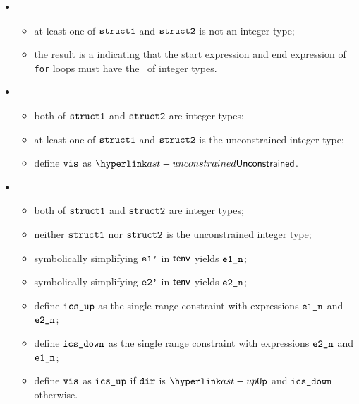 \ProseParagraph
\OneApplies
\begin{itemize}
  \item {}
  \begin{itemize}
    \item at least one of $\structone$ and $\structtwo$ is not an integer type;
    \item the result is a \typingerrorterm{} indicating that the start expression and end expression of \texttt{for} loops
          must have the \structure\ of integer types.
  \end{itemize}

  \item {}
  \begin{itemize}
    \item both of $\structone$ and $\structtwo$ are integer types;
    \item at least one of $\structone$ and $\structtwo$ is the unconstrained integer type;
    \item define $\vis$ as $\unconstrained$.
  \end{itemize}

  \item {}
  \begin{itemize}
    \item both of $\structone$ and $\structtwo$ are integer types;
    \item neither $\structone$ nor $\structtwo$ is the unconstrained integer type;
    \item symbolically simplifying $\veonep$ in $\tenv$ yields $\eonen$\ProseOrTypeError;
    \item symbolically simplifying $\vetwop$ in $\tenv$ yields $\etwon$\ProseOrTypeError;
    \item define $\icsup$ as the single range constraint with expressions $\eonen$ and $\etwon$;
    \item define $\icsdown$ as the single range constraint with expressions $\etwon$ and $\eonen$;
    \item define $\vis$ as $\icsup$ if $\dir$ is $\UP$ and $\icsdown$ otherwise.
  \end{itemize}
\end{itemize}

\FormallyParagraph
\begin{mathpar}
\end{mathpar}

